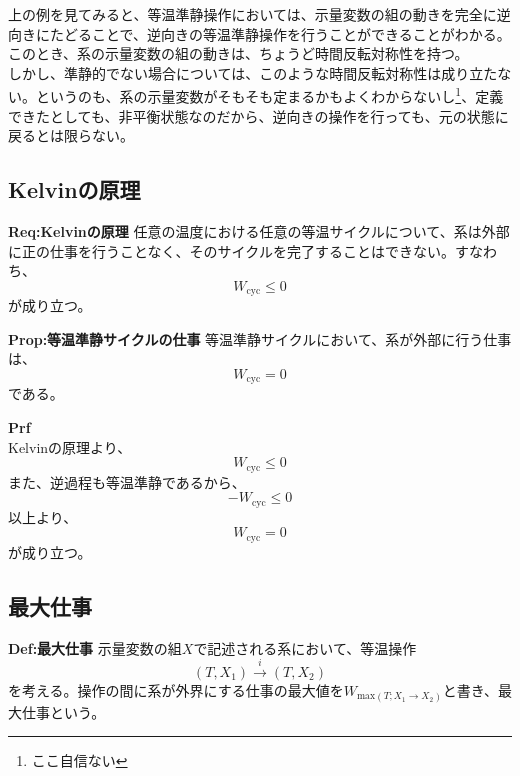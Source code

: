 \documentclass[a4paper,11pt]{jsarticle}
\begin{document}
上の例を見てみると、等温準静操作においては、示量変数の組の動きを完全に逆向きにたどることで、逆向きの等温準静操作を行うことができることがわかる。このとき、系の示量変数の組の動きは、ちょうど時間反転対称性を持つ。\\
しかし、準静的でない場合については、このような時間反転対称性は成り立たない。というのも、系の示量変数がそもそも定まるかもよくわからないし\footnote{ここ自信ない}、定義できたとしても、非平衡状態なのだから、逆向きの操作を行っても、元の状態に戻るとは限らない。


\subsection{Kelvinの原理}
\begin{itembox}[l]{\textbf{Req:Kelvinの原理}}
    任意の温度における任意の等温サイクルについて、系は外部に正の仕事を行うことなく、そのサイクルを完了することはできない。すなわち、
    \begin{equation}
        W_{\text{cyc}} \leq 0
    \end{equation}
    が成り立つ。
\end{itembox}

\begin{itembox}[l]{\textbf{Prop:等温準静サイクルの仕事}}
    等温準静サイクルにおいて、系が外部に行う仕事は、
    \begin{equation}
        W_{\text{cyc}} = 0
    \end{equation}
    である。
\end{itembox}
\textbf{Prf}\\
Kelvinの原理より、
\begin{equation}
    W_{\text{cyc}} \leq 0
\end{equation}
また、逆過程も等温準静であるから、
\begin{equation}
    -W_{\text{cyc}} \leq 0
\end{equation}
以上より、
\begin{equation}
    W_{\text{cyc}} = 0
\end{equation}
が成り立つ。\\

\subsection{最大仕事}
\begin{itembox}[l]{\textbf{Def:最大仕事}}
    示量変数の組$X$で記述される系において、等温操作
    \begin{equation}
        (T,X_1) \xrightarrow{i} (T,X_2)
    \end{equation}
    を考える。操作の間に系が外界にする仕事の最大値を$W_{\text{max}(T;X_1\rightarrow X_2)}$と書き、最大仕事という。
\end{itembox}
\end{document}
